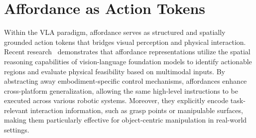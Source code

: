 \documentclass[10pt, a4paper, logo, copyright]{googledeepmind} %
\begin{document}


\section{Affordance as Action Tokens}
\label{sec:affordance}

Within the VLA paradigm, affordance serves as structured and spatially grounded action tokens that bridges visual perception and physical interaction. Recent research~\cite{stone2023open, huanga3vlm, xu2024manifoundation, qi2025sofar} demonstrates that affordance representations utilize the spatial reasoning capabilities of vision-language foundation models to identify actionable regions and evaluate physical feasibility based on multimodal inputs. By abstracting away embodiment-specific control mechanisms, affordances enhance cross-platform generalization, allowing the same high-level instructions to be executed across various robotic systems. Moreover, they explicitly encode task-relevant interaction information, such as grasp points or manipulable surfaces, making them particularly effective for object-centric manipulation in real-world settings.
\end{document}
